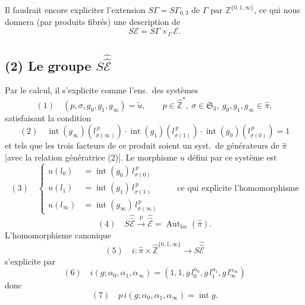 \documentclass[11pt,a4paper]{article}
\begin{document}

Il faudrait encore expliciter l'extension $S\Gamma = S\Gamma_{0,3}$ de
$\Gamma$ par $\mathbb{Z}^{\{0,1,\infty\}}$, ce qui nous donnera (par produits
fibrés) une description de
\[
S\mathcal{E} = S\Gamma \times_{\Gamma} \mathcal{E} .
\]


\subsection{(2) Le groupe $S\hat{\hat{\mathcal{E}}}$}

Par le calcul, il s'explicite comme l'ens.\ des systèmes
\[
(1)\quad (p, \sigma, g_0, g_1, g_\infty) = \tilde u, \qquad
p \in \hat{\mathbb{Z}}^{*},\ \sigma \in \mathfrak{S}_3,\ g_0, g_1, g_\infty
\in \hat\pi,
\]
satisfaisant la condition
\[
(2)\quad \operatorname{int}(g_\infty)(l_{\sigma(\infty)}^{\,p}) \cdot
\operatorname{int}(g_1)(l_{\sigma(1)}^{\,p}) \cdot
\operatorname{int}(g_0)(l_{\sigma(0)}^{\,p}) = 1
\]
et tels que les trois facteurs de ce produit soient un syst.\ de générateurs
de $\hat\pi$ [avec la relation génératrice (2)]. Le morphisme $u$ défini
par ce  système est
\[
(3)\quad
\left\{
\begin{aligned}
u(l_0) &= \operatorname{int}(g_0)\, l_{\sigma(0)}^{\,p}\\
u(l_1) &= \operatorname{int}(g_1)\, l_{\sigma(1)}^{\,p}\\
u(l_\infty) &= \operatorname{int}(g_\infty)\, l_{\sigma(\infty)}^{\,p}
\end{aligned}
\right.
\qquad \text{ce qui explicite l'homomorphisme}
\]
\[
(4)\quad S\hat{\hat{\mathcal{E}}} \xrightarrow{\ p\ } \hat{\hat{\mathcal{E}}} =
\operatorname{Aut}_{\mathrm{lac}}(\hat\pi) .
\]
L'homomorphisme canonique
\[
(5)\quad i : \hat\pi \times \hat{\mathbb{Z}}^{\{0,1,\infty\}} \longrightarrow
S\hat{\hat{\mathcal{E}}}
\]
s'explicite par
\[
(6)\quad i(g; \alpha_0, \alpha_1, \alpha_\infty) = (1, 1, g\,l_0^{\alpha_0},
g\,l_1^{\alpha_1}, g\,l_\infty^{\alpha_\infty})
\]
donc
\[
(7)\quad p\,i(g; \alpha_0, \alpha_1, \alpha_\infty) = \operatorname{int} g .
\]

\end{document}
